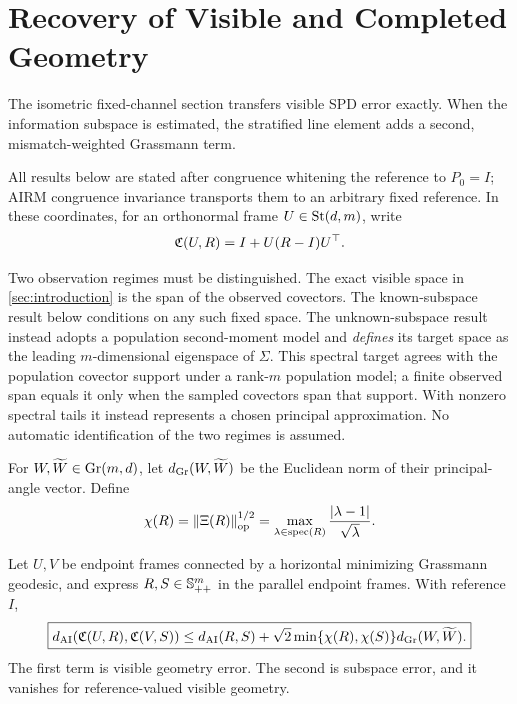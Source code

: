 \section{Recovery of Visible and Completed Geometry}
\label{sec:statistical-recovery}

The isometric fixed-channel section transfers visible SPD error exactly.  When
the information subspace is estimated, the stratified line element adds a
second, mismatch-weighted Grassmann term.

All results below are stated after congruence whitening the reference to
\(P_0=I\); AIRM congruence invariance transports them to an arbitrary fixed
reference.  In these coordinates, for an orthonormal frame
\(U\in\mathrm{St}(d,m)\), write
\begin{equation}
  \mathfrak C(U,R)=I+U(R-I)U^\top.
  \label{eq:normalized-completion}
\end{equation}

Two observation regimes must be distinguished.  The exact visible space in
\cref{sec:introduction} is the span of the observed covectors.  The
known-subspace result below conditions on any such fixed space.  The
unknown-subspace result instead adopts a population second-moment model and
\emph{defines} its target space as the leading \(m\)-dimensional eigenspace
of \(\Sigma\).  This spectral target agrees with the population covector
support under a rank-\(m\) population model; a finite observed span equals it
only when the sampled covectors span that support.  With nonzero spectral
tails it instead represents a chosen principal approximation.  No automatic
identification of the two regimes is assumed.

For \(W,\widetilde W\in\mathrm{Gr}(m,d)\), let \(d_{\mathrm{Gr}}(W,\widetilde W)\) be the
Euclidean norm of their principal-angle vector.  Define
\begin{equation}
  \chi(R)=\left\lVert \Xi(R)\right\rVert_{\operatorname{op}}^{1/2}
  =\max_{\lambda\in\operatorname{spec}(R)}
  \frac{|\lambda-1|}{\sqrt\lambda}.
  \label{eq:chi}
\end{equation}

\begin{theorem}
\label{thm:joint-perturbation}
Let \(U,V\) be endpoint frames connected by a horizontal minimizing
Grassmann geodesic, and express \(R,S\in\mathbb S_{++}^m\) in the parallel endpoint
frames.  With reference \(I\),
\begin{equation}
  \boxed{
  d_{\mathrm{AI}}(\mathfrak C(U,R),\mathfrak C(V,S))
  \le
  d_{\mathrm{AI}}(R,S)
  +\sqrt2\min\{\chi(R),\chi(S)\}d_{\mathrm{Gr}}(W,\widetilde W).}
  \label{eq:joint-perturbation}
\end{equation}
The first term is visible geometry error.  The second is subspace error, and
it vanishes for reference-valued visible geometry.
\end{theorem}

